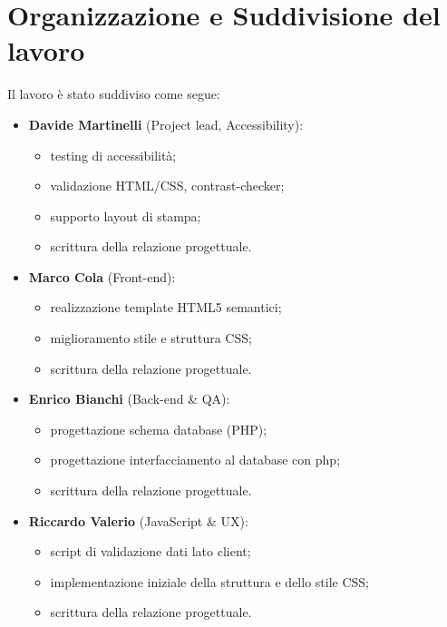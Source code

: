 \documentclass{article}
\begin{document}
\newpage

\section{Organizzazione e Suddivisione del lavoro}
Il lavoro è stato suddiviso come segue:
\begin{itemize}
    \item \textbf{Davide Martinelli} (Project lead, Accessibility):
            \begin{itemize}
                \item testing di accessibilità;
                \item validazione HTML/CSS, contrast-checker;
                \item supporto layout di stampa;
                \item scrittura della relazione progettuale.
            \end{itemize}
    \item \textbf{Marco Cola} (Front-end):
            \begin{itemize}
                \item realizzazione template HTML5 semantici;
                \item miglioramento stile e struttura CSS;
                \item scrittura della relazione progettuale.
            \end{itemize}
    \item \textbf{Enrico Bianchi} (Back-end \& QA):
            \begin{itemize}
                \item progettazione schema database (PHP);
                \item progettazione interfacciamento al database con php;
                \item scrittura della relazione progettuale.
            \end{itemize}
   \item \textbf{Riccardo Valerio} (JavaScript \& UX):
            \begin{itemize}
                \item script di validazione dati lato client;
                \item implementazione iniziale della struttura e dello stile CSS;
                \item scrittura della relazione progettuale.
            \end{itemize}
\end{itemize}
\end{document}

